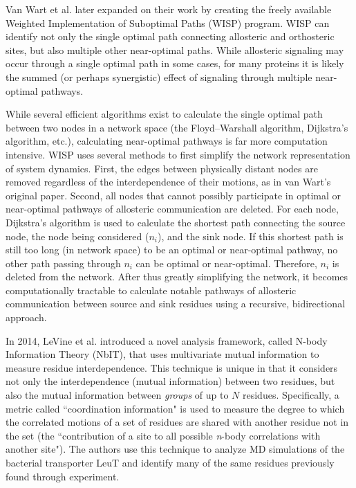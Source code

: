 \par Van Wart et al. later expanded on their work by creating the freely available Weighted Implementation of Suboptimal Paths (WISP) program.\cite{VanWart2014a} WISP can identify not only the single optimal path connecting allosteric and orthosteric sites, but also multiple other near-optimal paths. While allosteric signaling may occur through a single optimal path in some cases, for many proteins it is likely the summed (or perhaps synergistic) effect of signaling through multiple near-optimal pathways.
\par While several efficient algorithms exist to calculate the single optimal path between two nodes in a network space (\eg the Floyd–Warshall algorithm, Dijkstra's algorithm, etc.), calculating near-optimal pathways is far more computation intensive. WISP uses several methods to first simplify the network representation of system dynamics. First, the edges between physically distant nodes are removed regardless of the interdependence of their motions, as in van Wart’s original paper. Second, all nodes that cannot possibly participate in optimal or near-optimal pathways of allosteric communication are deleted. For each node, Dijkstra's algorithm is used to calculate the shortest path connecting the source node, the node being considered ($n_i$), and the sink node. If this shortest path is still too long (in network space) to be an optimal or near-optimal pathway, no other path passing through $n_i$ can be optimal or near-optimal. Therefore, $n_i$ is deleted from the network. After thus greatly simplifying the network, it becomes computationally tractable to calculate notable pathways of allosteric communication between source and sink residues using a recursive, bidirectional approach.
\par In 2014, LeVine et al. introduced a novel analysis framework, called N-body Information Theory (NbIT), that uses multivariate mutual information to measure residue interdependence. This technique is unique in that it considers not only the interdependence (mutual information) between two residues, but also the mutual information between \textit{groups} of up to $N$ residues. Specifically, a metric called ``coordination information" is used to measure the degree to which the correlated motions of a set of residues are shared with another residue not in the set (\ie the ``contribution of a site to all possible \textit{n}-body correlations with another site"). The authors use this technique to analyze MD simulations of the bacterial transporter LeuT and identify many of the same residues previously found through experiment.\cite{LeVine2014a}
